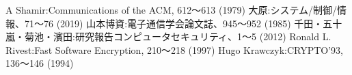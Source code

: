 \documentclass[twocolumn,a4paper]{jsarticle}
\begin{document}
	\begin{thebibliography}{99}
		\fontsize{8pt}{4mm}\selectfont
		A Shamir:Communications of the ACM, 612〜613 (1979)
		大原:システム/制御/情報、71〜76 (2019)
		山本博資:電子通信学会論文誌、945〜952 (1985)
		千田・五十嵐・菊池・濱田:研究報告コンピュータセキュリティ、1〜5 (2012)
		Ronald L. Rivest:Fast Software Encryption, 210〜218 (1997)
		Hugo Krawczyk:CRYPTO'93, 136〜146 (1994)
	\end{thebibliography}
\end{document}
